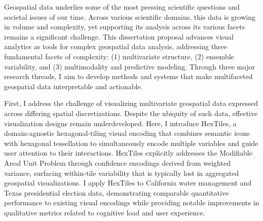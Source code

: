 Geospatial data underlies some of the most pressing scientific questions and societal issues of our time. Across various scientific domains, this data is growing in volume and complexity, yet supporting its analysis across its various facets remains a significant challenge. This dissertation proposal advances visual analytics as tools for complex geospatial data analysis, addressing three fundamental facets of complexity: (1) multivariate structure, (2) ensemble variability, and (3) multimodality and predictive modeling. Through three major research threads, I aim to develop methods and systems that make multifaceted geospatial data interpretable and actionable.

First, I address the challenge of visualizing multivariate geospatial data expressed across differing spatial discretizations. Despite the ubiquity of such data, effective visualization designs remain underdeveloped. Here, I introduce HexTiles, a domain-agnostic hexagonal-tiling visual encoding that combines semantic icons with hexagonal tessellation to simultaneously encode multiple variables and guide user attention to their interactions. HexTiles explicitly addresses the Modifiable Areal Unit Problem through confidence encodings derived from weighted variance, surfacing within-tile variability that is typically lost in aggregated geospatial visualizations. I apply HexTiles to California water management and Texas presidential election data, demonstrating comparable quantitative performance to existing visual encodings while providing notable improvements in qualitative metrics related to cognitive load and user experience.

